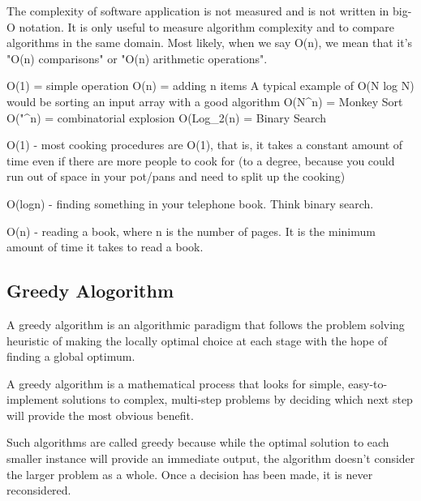 
The complexity of software application is not measured and is not written in big-O notation. It is only useful to measure algorithm complexity and to compare algorithms in the same domain. Most likely, when we say O(n), we mean that it's "O(n) comparisons" or "O(n) arithmetic operations". 

O(1) = simple operation
O(n) = adding n items
A typical example of O(N log N) would be sorting an input array with a good algorithm 
O(N^n) = Monkey Sort
O("^n) = combinatorial explosion
O(Log_2(n) = Binary Search


O(1) - most cooking procedures are O(1), that is, it takes a constant amount of time even if there are more people to cook for (to a degree, because you could run out of space in your pot/pans and need to split up the cooking)

O(logn) - finding something in your telephone book. Think binary search.

O(n) - reading a book, where n is the number of pages. It is the minimum amount of time it takes to read a book.


\subsection{Greedy Alogorithm}
A greedy algorithm is an algorithmic paradigm that follows the problem solving heuristic of making the locally optimal choice at each stage with the hope of finding a global optimum.

A greedy algorithm is a mathematical process that looks for simple, easy-to-implement solutions to complex, multi-step problems by deciding which next step will provide the most obvious benefit.

Such algorithms are called greedy because while the optimal solution to each smaller instance will provide an immediate output, the algorithm doesn’t consider the larger problem as a whole. Once a decision has been made, it is never reconsidered.
